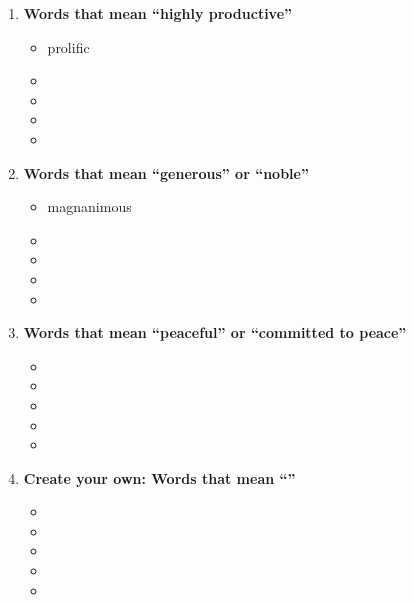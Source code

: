 \begin{enumerate}
\begin{itemize}
\end{itemize}

\item \textbf{Words that mean ``highly productive''}

\begin{itemize}
\item prolific
\item    
\item   
\item   
\item  

\end{itemize}

\item \textbf{Words that mean ``generous'' or ``noble''}

\begin{itemize}
\item    magnanimous
\item    
\item   
\item   
\item  

\end{itemize}

\item \textbf{Words that mean ``peaceful'' or ``committed to peace''}

\begin{itemize}
\item     
\item    
\item   
\item   
\item  

\end{itemize}

\item \textbf{Create your own: Words that mean ``\underline{\hspace{2in}}''}

\begin{itemize}
\item     
\item    
\item   
\item   
\item  

\end{itemize}

\end{enumerate}
